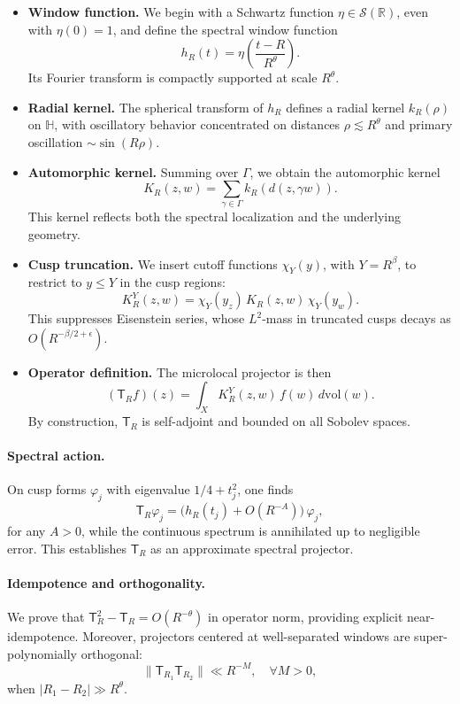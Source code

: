 \begin{itemize}
  \item \textbf{Window function.} We begin with a Schwartz function 
        $\eta \in \mathcal{S}(\mathbb{R})$, even with $\eta(0)=1$, and define the 
        spectral window function
        \[
          h_R(t) = \eta\!\left(\frac{t-R}{R^\theta}\right).
        \]
        Its Fourier transform is compactly supported at scale $R^\theta$.
  \item \textbf{Radial kernel.} The spherical transform of $h_R$ defines a radial kernel 
        $k_R(\rho)$ on $\mathbb{H}$, with oscillatory behavior concentrated on distances 
        $\rho \lesssim R^\theta$ and primary oscillation $\sim \sin(R\rho)$.
  \item \textbf{Automorphic kernel.} Summing over $\Gamma$, we obtain the automorphic 
        kernel
        \[
          K_R(z,w) = \sum_{\gamma \in \Gamma} k_R(d(z,\gamma w)).
        \]
        This kernel reflects both the spectral localization and the underlying geometry.
  \item \textbf{Cusp truncation.} We insert cutoff functions $\chi_Y(y)$, with 
        $Y = R^\beta$, to restrict to $y \leq Y$ in the cusp regions:
        \[
          K_R^Y(z,w) = \chi_Y(y_z)\,K_R(z,w)\,\chi_Y(y_w).
        \]
        This suppresses Eisenstein series, whose $L^2$-mass in truncated cusps decays as 
        $O(R^{-\beta/2+\epsilon})$.
  \item \textbf{Operator definition.} The microlocal projector is then
        \[
          (\mathsf{T}_R f)(z) = \int_X K_R^Y(z,w)\, f(w)\, d\mathrm{vol}(w).
        \]
        By construction, $\mathsf{T}_R$ is self-adjoint and bounded on all Sobolev spaces.
\end{itemize}

\paragraph{Spectral action.}  
On cusp forms $\varphi_j$ with eigenvalue $1/4+t_j^2$, one finds
\[
  \mathsf{T}_R \varphi_j = \big(h_R(t_j) + O(R^{-A})\big)\,\varphi_j,
\]
for any $A>0$, while the continuous spectrum is annihilated up to negligible error. This 
establishes $\mathsf{T}_R$ as an approximate spectral projector.

\paragraph{Idempotence and orthogonality.}  
We prove that $\mathsf{T}_R^2 - \mathsf{T}_R = O(R^{-\theta})$ in operator norm, 
providing explicit near-idempotence. Moreover, projectors centered at well-separated 
windows are super-polynomially orthogonal:
\[
  \|\mathsf{T}_{R_1}\mathsf{T}_{R_2}\| \ll R^{-M}, \quad \forall M>0,
\]
when $|R_1-R_2|\gg R^\theta$.

